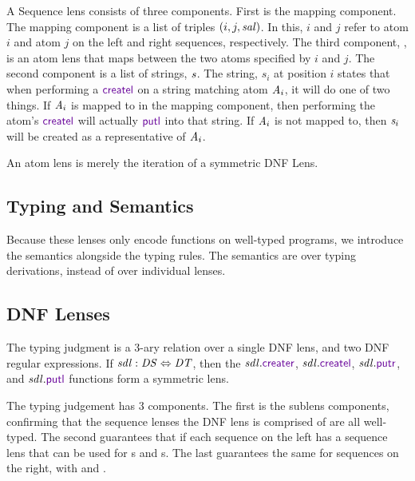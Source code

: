 \documentclass[acmsmall,screen,anonymous]{acmart}
\begin{document}
A Sequence lens \SSQLens{} consists of three components. First is the mapping
component. The mapping component is a list of triples $(i,j,\mathit{sal})$. In
this, $i$ and $j$ refer to atom $i$ and atom $j$ on the left and right
sequences, respectively. The third component, \SAtomLens{}, is an atom lens that
maps between the two atoms specified by $i$ and $j$. The second component is a
list of strings, $\mathit{s}$. The string, $s_i$ at position $i$ states that when
performing a $\CreateL$ on a string matching atom $\mathit{A}_i$, it will do one of
two things. If $\mathit{A}_i$ is mapped to in the mapping component, then performing
the atom's $\CreateL$ will actually $\PutL$ into that string. If $\mathit{A}_i$ is
not mapped to, then $\mathit{s}_i$ will be created as a representative of
$\mathit{A}_i$.

An atom lens \AtomLens{} is merely the iteration of a symmetric DNF Lens.


\subsection{Typing and Semantics}
Because these lenses only encode functions on well-typed programs, we introduce
the semantics alongside the typing rules.  The semantics are over typing
derivations, instead of over individual lenses.

\subsection{DNF Lenses}
The typing judgment is a 3-ary relation over a single DNF lens, and two DNF
regular expressions. If $\mathit{sdl} : \mathit{DS} \Leftrightarrow
\mathit{DT}$, then the $\SDNFLens.\CreateR$, $\SDNFLens.\CreateL$,
$\SDNFLens.\PutR$, and $\SDNFLens.\PutL$ functions form a symmetric lens.

The typing judgement has 3 components. The first is the sublens components,
confirming that the sequence lenses the DNF lens is comprised of are all
well-typed. The second guarantees that if each sequence on the left has a
sequence lens that can be used for \CreateR{}s and \PutR{}s. The last guarantees
the same for sequences on the right, with \CreateL{} and \PutL{}.
\end{document}
